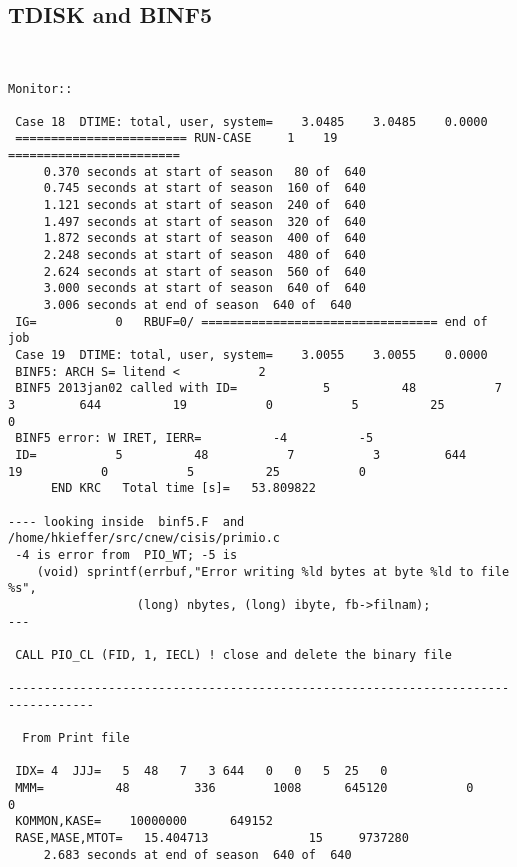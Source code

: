 \documentclass{article}
\begin{document}
\subsection{TDISK and BINF5} %
\vspace{-3.mm} 
\begin{verbatim}


Monitor::
                                                                            
 Case 18  DTIME: total, user, system=    3.0485    3.0485    0.0000
 ======================== RUN-CASE     1    19 ========================
     0.370 seconds at start of season   80 of  640
     0.745 seconds at start of season  160 of  640
     1.121 seconds at start of season  240 of  640
     1.497 seconds at start of season  320 of  640
     1.872 seconds at start of season  400 of  640
     2.248 seconds at start of season  480 of  640
     2.624 seconds at start of season  560 of  640
     3.000 seconds at start of season  640 of  640
     3.006 seconds at end of season  640 of  640
 IG=           0   RBUF=0/ ================================= end of job                                 
 Case 19  DTIME: total, user, system=    3.0055    3.0055    0.0000
 BINF5: ARCH S= litend <           2
 BINF5 2013jan02 called with ID=            5          48           7           3         644          19           0           5          25           0
 BINF5 error: W IRET, IERR=          -4          -5
 ID=           5          48           7           3         644          19           0           5          25           0
      END KRC   Total time [s]=   53.809822 

---- looking inside  binf5.F  and  /home/hkieffer/src/cnew/cisis/primio.c
 -4 is error from  PIO_WT; -5 is  
    (void) sprintf(errbuf,"Error writing %ld bytes at byte %ld to file %s", 
                  (long) nbytes, (long) ibyte, fb->filnam);
---   

 CALL PIO_CL (FID, 1, IECL) ! close and delete the binary file

----------------------------------------------------------------------------------

  From Print file 

 IDX= 4  JJJ=   5  48   7   3 644   0   0   5  25   0
 MMM=          48         336        1008      645120           0           0
 KOMMON,KASE=    10000000      649152
 RASE,MASE,MTOT=   15.404713              15     9737280
     2.683 seconds at end of season  640 of  640


\end{verbatim}
\end{document}
